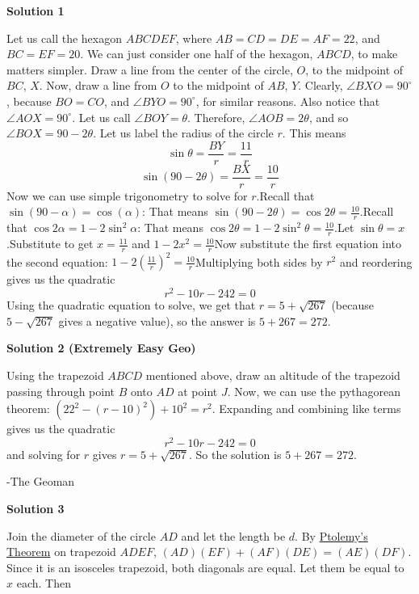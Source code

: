 \begin{enumerate}
\textbf{Solution 1}

Let us call the hexagon $ABCDEF$, where $AB=CD=DE=AF=22$, and $BC=EF=20$. We can just consider one half of the hexagon, $ABCD$, to make matters simpler. Draw a line from the center of the circle, $O$, to the midpoint of $BC$, $X$. Now, draw a line from $O$ to the midpoint of $AB$, $Y$. Clearly, $\angle BXO=90^{\circ}$, because $BO=CO$, and $\angle BYO=90^{\circ}$, for similar reasons. Also notice that $\angle AOX=90^{\circ}$. Let us call $\angle BOY=\theta$. Therefore, $\angle AOB=2\theta$, and so $\angle BOX=90-2\theta$. Let us label the radius of the circle $r$. This means 
 \[\sin{\theta}=\frac{BY}{r}=\frac{11}{r}\] 
 \[\sin{(90-2\theta)}=\frac{BX}{r}=\frac{10}{r}\]Now we can use simple trigonometry to solve for $r$.Recall that  $\sin{(90-\alpha)}=\cos(\alpha)$: That means $\sin{(90-2\theta)}=\cos{2\theta}=\frac{10}{r}$.Recall that $\cos{2\alpha}=1-2\sin^2{\alpha}$: That means $\cos{2\theta}=1-2\sin^2{\theta}=\frac{10}{r}$.Let $\sin{\theta}=x$.Substitute to get $x=\frac{11}{r}$ and $1-2x^2=\frac{10}{r}$Now substitute the first equation into the second equation: $1-2\left(\frac{11}{r}\right)^2=\frac{10}{r}$Multiplying both sides by $r^2$ and reordering gives us the quadratic 
 \[r^2-10r-242=0\]Using the quadratic equation to solve, we get that $r=5+\sqrt{267}$ (because $5-\sqrt{267}$ gives a negative value), so the answer is $5+267=\boxed{272}$.

 



\textbf{Solution 2 (Extremely Easy Geo)}

Using the trapezoid $ABCD$ mentioned above, draw an altitude of the trapezoid passing through point $B$ onto $AD$ at point $J$. Now, we can use the pythagorean theorem: $(22^2-(r-10)^2)+10^2=r^2$. Expanding and combining like terms gives us the quadratic 
 \[r^2-10r-242=0\] and solving for $r$ gives $r=5+\sqrt{267}$. So the solution is $5+267=\boxed{272}$.

 -The Geoman

 



\textbf{Solution 3}

Join the diameter of the circle $AD$ and let the length be $d$. By \href{https://artofproblemsolving.com/wiki/index.php?title=Ptolemy\%27s\_Theorem}{Ptolemy's Theorem} on trapezoid $ADEF$, $(AD)(EF) + (AF)(DE) = (AE)(DF)$. Since it is an isosceles trapezoid, both diagonals are equal. Let them be equal to $x$ each. Then


\end{enumerate}
